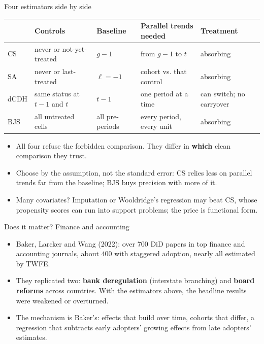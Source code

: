 \documentclass[
  11pt,
  ignorenonframetext,
  aspectratio=169,
]{beamer}
\providecommand{\tightlist}{%
  \setlength{\itemsep}{0pt}\setlength{\parskip}{0pt}}
\begin{document}
\begin{frame}{Four estimators side by side}
\protect{}\label{four-estimators-side-by-side}
\begin{center}\scriptsize
\begin{tabular}{lllll}
\toprule
 & Controls & Baseline & Parallel trends needed & Treatment \\
\midrule
CS & never or not-yet-treated & $g - 1$ & from $g - 1$ to $t$ & absorbing \\
SA & never or last-treated & $\ell = -1$ & cohort vs. that control & absorbing \\
dCDH & same status at $t-1$ and $t$ & $t - 1$ & one period at a time & can switch; no carryover \\
BJS & all untreated cells & all pre-periods & every period, every unit & absorbing \\
\bottomrule
\end{tabular}
\end{center}

\begin{itemize}
\tightlist
\item
  All four refuse the forbidden comparison. They differ in
  \textbf{which} clean comparison they trust.
\item
  Choose by the assumption, not the standard error: CS relies less on
  parallel trends far from the baseline; BJS buys precision with more of
  it.
\item
  Many covariates? Imputation or Wooldridge's regression may beat CS,
  whose propensity scores can run into support problems; the price is
  functional form.
\end{itemize}
\end{frame}

\begin{frame}{Does it matter? Finance and accounting}
\protect{}\label{does-it-matter-finance-and-accounting}
\begin{itemize}
\tightlist
\item
  Baker, Larcker and Wang (2022): over \(700\) DiD papers in top finance
  and accounting journals, about \(400\) with staggered adoption, nearly
  all estimated by TWFE.
\item
  They replicated two: \textbf{bank deregulation} (interstate branching)
  and \textbf{board reforms} across countries. With the estimators
  above, the headline results were weakened or overturned.
\item
  The mechanism is Baker's: effects that build over time, cohorts that
  differ, a regression that subtracts early adopters' growing effects
  from late adopters' estimates.
\end{itemize}
\end{frame}
\end{document}
